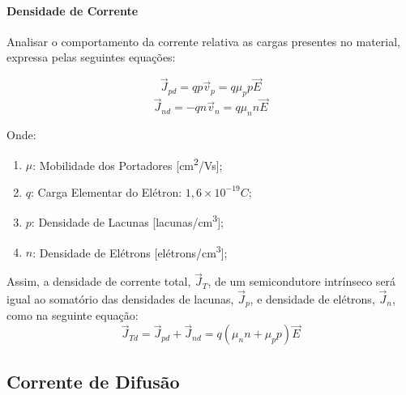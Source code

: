 \documentclass{article}
\begin{document}
            \paragraph{Densidade de Corrente}Analisar o comportamento da corrente relativa as cargas presentes no material, expressa pelas seguintes equações:
                \begin{multicols}{2}
                    \begin{equation}
                        \boxed{
                            \vec{J}_{pd} = q p \vec{v}_{p} = q \mu_{p} p \vec{E}
                        }\label{eq:3}
                    \end{equation}
                    \begin{equation}
                        \boxed{
                            \vec{J}_{nd} = - q n \vec{v}_{n} = q \mu_{n} n \vec{E}
                        }\label{eq:4}
                    \end{equation}
                \end{multicols}\noindent
            Onde:
                \begin{enumerate}[noitemsep]
                    \item $\mu$: Mobilidade dos Portadores [cm\textsuperscript{2}/Vs];
                    \item $q$: Carga Elementar do Elétron: $1,6 \times 10^{-19} C$;
                    \item $p$: Densidade de Lacunas [lacunas/cm\textsuperscript{3}];
                    \item $n$: Densidade de Elétrons [elétrons/cm\textsuperscript{3}];
                \end{enumerate}
            Assim, a densidade de corrente total, $\vec{J}_{T}$, de um semicondutore intrínseco será igual ao somatório das densidades de lacunas, $\vec{J}_{p}$, e densidade de elétrons, $\vec{J}_{n}$, como na seguinte equação:
                \begin{equation}
                    \boxed{
                        \vec{J}_{Td} = \vec{J}_{pd} + \vec{J}_{nd} = q (\mu_{n} n + \mu_{p} p)\vec{E}
                    }\label{eq:5}
                \end{equation}

        \subsection{Corrente de Difusão}
\end{document}
